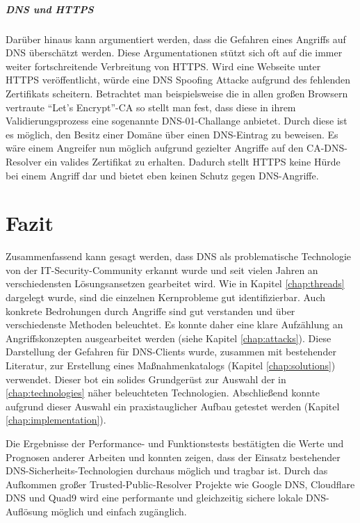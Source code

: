 \paragraph{DNS und HTTPS}
Darüber hinaus kann argumentiert werden, dass die Gefahren eines Angriffs auf DNS überschätzt werden. Diese Argumentationen stützt sich oft auf die immer weiter fortschreitende Verbreitung von HTTPS. Wird eine Webseite unter HTTPS veröffentlicht, würde eine DNS Spoofing Attacke aufgrund des fehlenden Zertifikats scheitern. Betrachtet man beispielsweise die in allen großen Browsern vertraute ``Let's Encrypt''-CA so stellt man fest, dass diese in ihrem Validierungsprozess eine sogenannte DNS-01-Challange anbietet. Durch diese ist es möglich, den Besitz einer Domäne über einen DNS-Eintrag zu beweisen. Es wäre einem Angreifer nun möglich aufgrund gezielter Angriffe auf den CA-DNS-Resolver ein valides Zertifikat zu erhalten. Dadurch stellt HTTPS keine Hürde bei einem Angriff dar und bietet eben keinen Schutz gegen DNS-Angriffe.

\chapter{Fazit}
\label{chap:conclusion}
Zusammenfassend kann gesagt werden, dass DNS als problematische Technologie von der IT-Security-Community erkannt wurde und seit vielen Jahren an verschiedensten Lösungsansetzen gearbeitet wird. Wie in Kapitel \ref{chap:threads} dargelegt wurde, sind die einzelnen Kernprobleme gut identifizierbar. Auch konkrete Bedrohungen durch Angriffe sind gut verstanden und über verschiedenste Methoden beleuchtet. Es konnte daher eine klare Aufzählung an Angriffskonzepten ausgearbeitet werden (siehe Kapitel \ref{chap:attacks}). Diese Darstellung der Gefahren für DNS-Clients wurde, zusammen mit bestehender Literatur, zur Erstellung eines Maßnahmenkatalogs (Kapitel \ref{chap:solutions}) verwendet. Dieser bot ein solides Grundgerüst zur Auswahl der in \ref{chap:technologies} näher beleuchteten Technologien. Abschließend konnte aufgrund dieser Auswahl ein praxistauglicher Aufbau getestet werden (Kapitel \ref{chap:implementation}). 

Die Ergebnisse der Performance- und Funktionstests bestätigten die Werte und Prognosen anderer Arbeiten und konnten zeigen, dass der Einsatz bestehender DNS-Sicherheits-Technologien durchaus möglich und tragbar ist. Durch das Aufkommen großer Trusted-Public-Resolver Projekte wie Google DNS, Cloudflare DNS und Quad9 wird eine performante und gleichzeitig sichere lokale DNS-Auflösung möglich und einfach zugänglich. 

